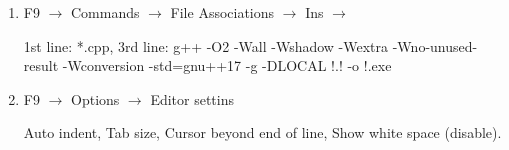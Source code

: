 \begin{enumerate}
    \item
  F9 $\rightarrow$ Commands $\rightarrow$ File Associations $\rightarrow$ Ins $\rightarrow$

  1st line: *.cpp, 3rd line: g++ -O2 -Wall -Wshadow -Wextra -Wno-unused-result -Wconversion -std=gnu++17 -g -DLOCAL !.! -o !.exe
  
  \item
  F9 $\rightarrow$ Options $\rightarrow$ Editor settins
  
  Auto indent, Tab size, Cursor beyond end of line, Show white space (disable).
\end{enumerate}
